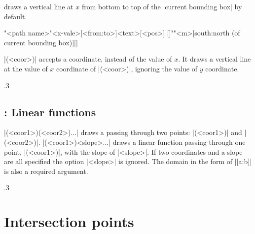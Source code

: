 \icmd{\tzvfnat} draws a vertical line at $x$ from bottom to top of the |current bounding box| by default.

\begin{tzdef}{}
\tzvfnat[<opt>]"<path name>"{<x-vale>}[<from:to>]{<text>}[<pos>]
  []""{<m>}[south:north (of current bounding box)]{}[]
\end{tzdef}

\icmd{\tzvfn}|(<coor>)| accepts a coordinate, instead of the value of $x$. It draws a vertical line at the value of $x$ coordinate of |(<coor>)|, ignoring the value of $y$ coordinate.

\begin{tzcode}{.3}
\end{tzcode}



\subsection{\protect\cmd{\tzLFn}: Linear functions}
\label{ssi:tzLFn}

\icmd{\tzLFn}|(<coor1>)(<coor2>)...| draws a  passing through two points: |(<coor1>)| and |(<coor2>)|.
|\tzLFn(<coor1>){<slope>}...| draws a linear function passing through one point, |(<coor1>)|,  with the slope of |<slope>|. If two coordinates and a slope are all specified the option |{<slope>}| is ignored. The domain in the form of |[a:b]| is also a required argument.

\begin{tzcode}{.3}
\end{tzcode}



\section{Intersection points}
\label{si:intersections}

